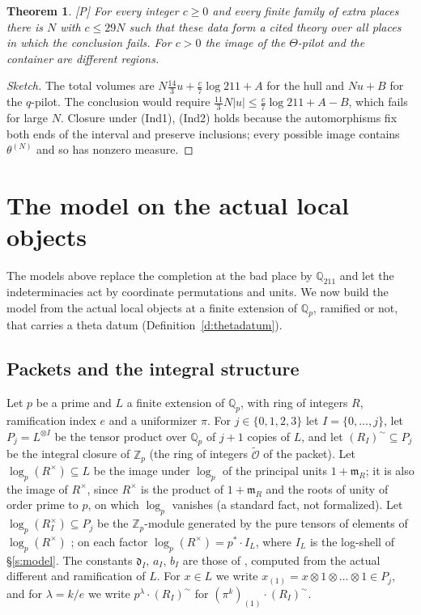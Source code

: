 \documentclass[11pt]{article}
\theoremstyle{plain}
\newtheorem{theorem}{Theorem}
\theoremstyle{definition}
\theoremstyle{remark}
\newcommand{\Pmark}{\textup{[P]}}
\newcommand{\Qp}[1]{\mathbb Q_{#1}}
\newcommand{\tI}{(R_I)^{\sim}}
\newcommand{\tO}{\widetilde{\mathcal O}}
\begin{document}
\begin{theorem}\label{t:enlarged}
\Pmark{} For every integer $c\ge0$ and every finite family of extra places there is $N$ with
$c\le29N$ such that these data form a cited theory over all places in which the conclusion
fails. For $c>0$ the image of the $\Theta$-pilot and the container are
different regions.
\end{theorem}

\begin{proof}[Sketch]
The total volumes are $N\frac{14}3u+\frac c7\log211+A$ for the hull and $Nu+B$ for the
$q$-pilot. The conclusion would require $\frac{11}3N|u|\le\frac c7\log211+A-B$, which
fails for large $N$. Closure under (Ind1), (Ind2) holds because the automorphisms fix both
ends of the interval and preserve inclusions; every possible image contains
$\theta^{(N)}$ and so has nonzero measure.
\end{proof}

\section{The model on the actual local objects}\label{s:actual}

The models above replace the completion at the bad place by $\Qp{211}$ and let the
indeterminacies act by coordinate permutations and units. We now build the model from the
actual local objects at a finite extension of $\Qp p$, ramified or not, that carries a theta
datum (Definition~\ref{d:thetadatum}).

\subsection{Packets and the integral structure}\label{s:packets}

Let $p$ be a prime and $L$ a finite extension of $\Qp p$, with ring of integers $R$,
ramification index $e$ and a uniformizer $\pi$. For $j\in\{0,1,2,3\}$ let $I=\{0,\dots,j\}$,
let $P_j=L^{\otimes I}$ be the tensor product over $\Qp p$ of $j+1$ copies of $L$, and let
$\tI\subseteq P_j$ be the integral closure of $\mathbb Z_p$ (the ring of integers $\tO$ of
the packet). Let $\log_p(R^\times)\subseteq L$
be the image under $\log_p$ of the principal units $1+\mathfrak m_R$; it is also the image
of $R^\times$, since $R^\times$ is the product of $1+\mathfrak m_R$ and the roots of unity
of order prime to $p$, on which $\log_p$ vanishes (a standard fact, not formalized). Let
$\log_p(R_I^\times)\subseteq P_j$ be the $\mathbb Z_p$-module generated by the pure tensors
of elements of $\log_p(R^\times)$ \cite[Prop.~1.2]{IUT4}; on each factor
$\log_p(R^\times)=p^*\cdot I_L$, where $I_L$ is the log-shell of \S\ref{s:model}. The constants $\mathfrak d_I$, $a_I$, $b_I$ are those of
\cite[Prop.~1.1, 1.2]{IUT4}, computed from the actual different and ramification of $L$.
For $x\in L$ we write $x_{(1)}=x\otimes1\otimes\dots\otimes1\in P_j$, and for
$\lambda=k/e$ we write $p^\lambda\cdot\tI$ for $(\pi^k)_{(1)}\cdot\tI$.
\end{document}
